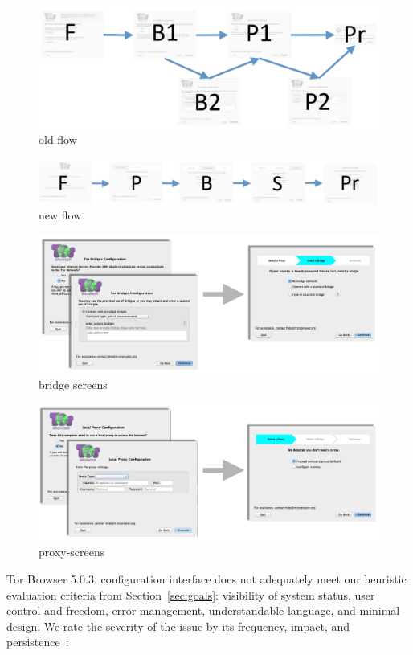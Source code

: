 \documentclass[USenglish,oneside,twocolumn]{article}
\begin{document}
\begin{figure}[t]
	\centering
		\includegraphics[width=.85\textwidth]{old-flow.pdf} 
		\caption{old flow} 
	\label{fig:old-flow}
\end{figure} 

\begin{figure}[t]
	\centering
		\includegraphics[width=1.0\textwidth]{new-flow.pdf} 
		\caption{new flow} 
\end{figure} 

\begin{figure}[t]
	\centering
		\includegraphics[width=.8\textwidth]{bridge-screens.pdf} 
		\caption{bridge screens} 
\end{figure} 

\begin{figure}[t]
	\centering
		\includegraphics[width=.8\textwidth]{proxy-screens.pdf} 
		\caption{proxy-screens} 
\end{figure} 

Tor Browser 5.0.3. configuration interface does not adequately meet our heuristic evaluation criteria from Section~\ref{sec:goals}: visibility of system status, user control and freedom, error management, understandable language, and minimal design. We rate the severity of the issue by its frequency, impact, and persistence~\cite{nielsen1994heuristic}:\\
\end{document}
